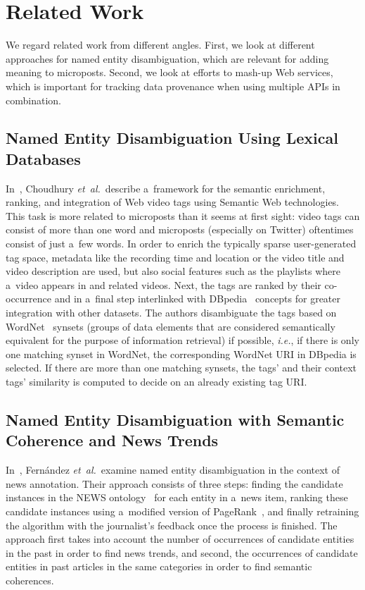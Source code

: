 \section{Related Work}

We regard related work from different angles.
First, we look at different approaches
for named entity disambiguation,
which are relevant for adding meaning to microposts.
Second, we look at efforts to mash-up Web services,
which is important for tracking data provenance
when using multiple APIs in combination.

\subsection{Named Entity Disambiguation Using Lexical Databases}

In~\cite{choudhury2009youtubetags},
Choudhury \emph{et~al.}\ describe a~framework for
the semantic enrichment, ranking, and integration
of Web video tags using Semantic Web technologies.
This task is more related to microposts
than it seems at first sight:
video tags can consist of more than one word
and microposts (especially on Twitter) oftentimes consist
of just a~few words.
In order to enrich the typically sparse
user-generated tag space,
metadata like the recording time and location
or the video title and video description are used,
but also social features such as the playlists
where a~video appears in and related videos.
Next, the tags are ranked by their co-occurrence
and in a~final step interlinked with DBpedia~\cite{auer2007dbpedia}
concepts for greater integration with other datasets.
The authors disambiguate the tags based on
WordNet~\cite{miller1995wordnet,fellbaum1998wordnet}
synsets (groups of data elements that are considered
semantically equivalent for the purpose of information retrieval)
if possible, \emph{i.e.},
if there is only one matching synset in WordNet,
the corresponding WordNet URI in DBpedia is selected.
If there are more than one matching synsets,
the tags' and their context tags' similarity is computed
to decide on an already existing tag URI.

\subsection{Named Entity Disambiguation with Semantic Coherence and News Trends}

In~\cite{fernandez2007identityrank},
Fernández \emph{et~al.}\ examine named entity disambiguation
in the context of news annotation.
Their approach consists of three steps:
finding the candidate instances in the NEWS
ontology~\cite{fernandez2010newsontology}
for each entity in a~news item,
ranking these candidate instances
using a~modified version of
PageRank~\cite{brin1998pagerank},
and finally retraining the algorithm
with the journalist's feedback once the process is finished.
The approach first takes into account the number
of occurrences of candidate entities in the past
in order to find news trends,
and second, the occurrences of candidate entities
in past articles in the same categories
in order to find semantic coherences.

